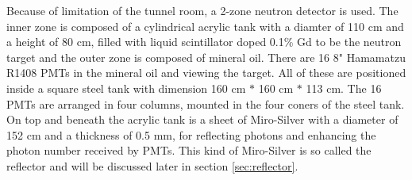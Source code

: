 Because of limitation of the tunnel room, a 2-zone neutron detector is used. The inner zone
is composed of a cylindrical acrylic tank with a diamter of 110 cm and a height of 80 cm, filled with liquid scintillator doped 0.1\% Gd to be the neutron target and
the outer zone is composed of mineral oil. There are 16 8" Hamamatzu R1408 PMTs in the mineral oil and viewing the target.
All of these are positioned inside a square steel tank with dimension 160 cm $*$ 160 cm $*$ 113 cm. The 16 PMTs
are arranged in four columns, mounted in the four coners of the steel tank. On top and beneath the acrylic tank is
a sheet of Miro-Silver with a diameter of 152 cm and a thickness of 0.5 mm, for reflecting photons and
enhancing the photon number received by PMTs. This kind of Miro-Silver is so called the reflector and will
be discussed later in section \ref{sec:reflector}.


%




